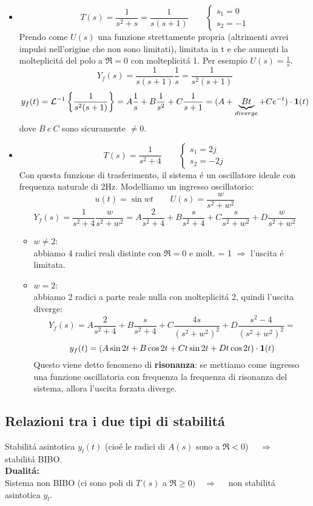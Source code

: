 \documentclass[../main.tex]{subfiles}
\begin{document}
		\begin{itemize}
			\item 
				\[
					T(s) = \frac{1}{s^2+s} = \frac{1}{s(s+1)} \qquad
					\begin{cases}
						s_1 = 0
						\\
						s_2 = -1
					\end{cases}
				\]
				Prendo come $ U(s) $ una funzione strettamente propria (altrimenti avrei impulsi nell'origine che non sono limitati), limitata in t e che aumenti la molteplicit\'{a} del polo a $ \Re = 0 $ con molteplicit\'{a} 1. Per esempio $ U(s) = \frac{1}{s} $.
				\[
					Y_f(s) = \frac{1}{s(s+1)}\frac{1}{s} = \frac{1}{s^2(s+1)}
				\]
				\[
					y_f(t) = \mathcal{L}^{-1} \left\lbrace \frac{1}{s^2(s+1)} \right\rbrace = A\frac{1}{s} + B\frac{1}{s^2} + C\frac{1}{s+1} = (A + \underbrace{Bt}_{diverge} + Ce^{-t}) \cdot \textbf{1}(t)
				\]
				dove $ B\ e\ C $ sono sicuramente $ \neq 0 $.
			\item
				\[
					T(s) = \frac{1}{s^2+4} \qquad
					\begin{cases}
						s_1=2j
						\\
						s_2=-2j
					\end{cases}
				\]
				Con questa funzione di trasferimento, il sistema \'{e} un oscillatore ideale con frequenza naturale di 2Hz.
				Modelliamo un ingresso oscillatorio:
				\[
					u(t) = \sin wt \qquad U(s) = \frac{w}{s^2+w^2}
				\]
				\[
					Y_f(s) = \frac{1}{s^2+4} \frac{w}{s^2+w^2} = A\frac{2}{s^2+4} + B\frac{s}{s^2+4} + C\frac{s}{s^2+w^2} + D\frac{w}{s^2+w^2}
				\]
				\begin{itemize}
					\item 
						$ w \neq 2 $:\\
						abbiamo 4 radici reali distinte con $ \Re = 0 $ e molt. = 1 $ \Rightarrow $ l'uscita \'{e} limitata.
					\item 
						$ w = 2 $:\\
						abbiamo 2 radici a parte reale nulla con molteplicit\'{a} 2, quindi l'uscita diverge:
						\[
							Y_f(s) = A\frac{2}{s^2+4} + B\frac{s}{s^2+4} + C\frac{4s}{(s^2+w^2)^2} + D\frac{s^2-4}{(s^2+w^2)^2} =
						\]
						\[ 
							y_f(t) = (A \sin2t + B \cos 2t + Ct \sin2t + Dt \cos 2t) \cdot \textbf{1}(t)
						\]
						Questo viene detto fenomeno di \textbf{risonanza}: se mettiamo come ingresso una funzione oscillatoria con frequenza la frequenza di risonanza del sistema, allora l'uscita forzata diverge.
				\end{itemize}
		\end{itemize}
	
	\subsection{Relazioni tra i due tipi di stabilit\'{a}}
		Stabilit\'{a} asintotica $ y_l(t) $ (cio\'{e} le radici di $ A(s) $ sono a $ \Re < 0 $) $ \quad \Rightarrow \quad $ stabilit\'{a} BIBO. \\
		\textbf{Dualit\'{a}:}\\
		Sistema non BIBO (ci sono poli di $ T(s) $ a $ \Re \geq 0) \quad \Rightarrow \quad $ non stabilit\'{a} asintotica $ y_l $.
\end{document}
